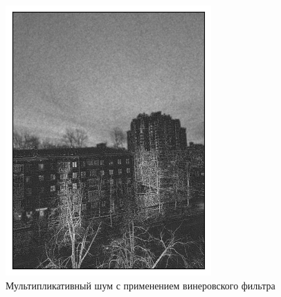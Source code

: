 \documentclass[a4paper,12pt]{article}
\begin{document}
\begin{figure}[H]
\begin{minipage}{0.49\textwidth}
        \centering \includegraphics[width=\textwidth]{results/nlf_speckle_6.png}
        \caption{Мультипликативный шум с применением винеровского фильтра}
    \end{minipage}
\end{figure}
\end{document}
